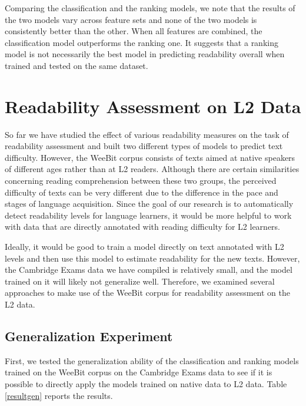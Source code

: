 \documentclass[11pt,letterpaper]{article}
\begin{document}
	Comparing the classification and the ranking models, we note that the results of the two models vary across feature sets and none of the two models is consistently better than the other. When all features are combined, the classification model outperforms the ranking one. It suggests that a ranking model is not necessarily the best model in predicting readability overall when trained and tested on the same dataset.

\section{Readability Assessment on L2 Data}

	So far we have studied the effect of various readability measures on the task of readability assessment and built two different types of models to predict text difficulty. However, the WeeBit corpus consists of texts aimed at native speakers of different ages rather than at L2 readers. Although there are certain similarities concerning reading comprehension between these two groups, the perceived difficulty of texts can be very different due to the difference in the pace and stages of language acquisition. Since the goal of our research is to automatically detect readability levels for language learners, it would be more helpful to work with data that are directly annotated with reading difficulty for L2 learners.
	
	Ideally, it would be good to train a model directly on text annotated with L2 levels and then use this model to estimate readability for the new texts. However, the Cambridge Exams data we have compiled is relatively  small, and the model trained on it will likely not generalize well. Therefore, we examined several approaches to make use of the WeeBit corpus for readability assessment on the L2 data. 

	
\subsection{Generalization Experiment}

	First, we tested the generalization ability of the classification and ranking models trained on the WeeBit corpus on the Cambridge Exams data to see if it is possible to directly apply the models trained on native data to L2 data. Table \ref{resultgen} reports the results.
	
\end{document}
